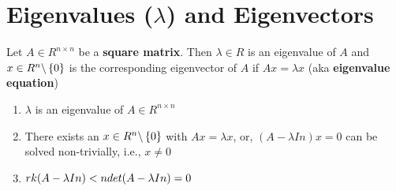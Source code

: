 \section{Eigenvalues ($\lambda$) and Eigenvectors} \label{Eigenvalues and Eigenvectors}

Let $A \in  R^{n\times n}$ be a \textbf{square matrix}. Then $\lambda  \in  R$ is an eigenvalue of $A$ and $x \in  R^n\backslash \left\{0\right\}$ is the corresponding eigenvector of $A$ if $Ax = \lambda x$ (aka \textbf{eigenvalue equation})

\begin{enumerate}
    \item $\lambda$  is an eigenvalue of $A \in  R^{n\times n}$

    \item There exists an $x \in  R^n\backslash \left\{0\right\}$ with $Ax = \lambda x$, or, $(A - \lambda In)x = 0$ can be solved non-trivially, i.e., $x \neq 0$

    \item \(
        \hfill
        rk(A - \lambda In) < n
        \hfill
        det(A - \lambda In) = 0
        \hfill
    \)
\end{enumerate}

